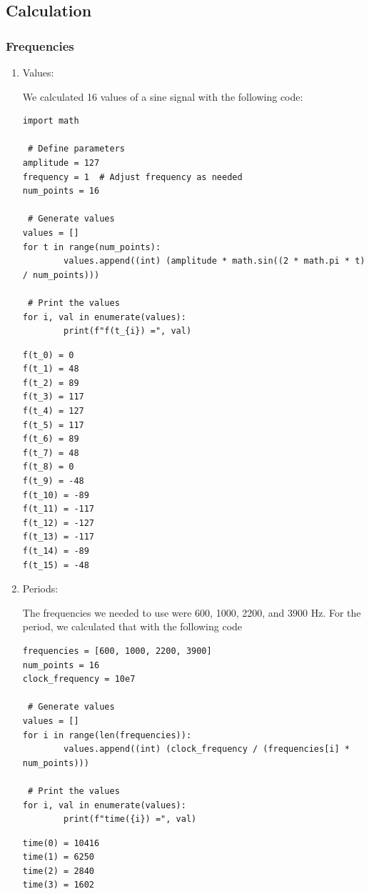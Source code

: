 \documentclass[a4paper, 12pt]{article}
\begin{document}
\subsection{Calculation}
\label{sec:org0fa0015}

\subsubsection{Frequencies}
\label{sec:org374977f}
\begin{enumerate}
\item Values:
\label{sec:org32cb88c}

We calculated 16 values of a sine signal with the following code:

\begin{verbatim}
import math

 # Define parameters
amplitude = 127
frequency = 1  # Adjust frequency as needed
num_points = 16

 # Generate values
values = []
for t in range(num_points):
        values.append((int) (amplitude * math.sin((2 * math.pi * t) / num_points)))

 # Print the values
for i, val in enumerate(values):
        print(f"f(t_{i}) =", val)
\end{verbatim}

\begin{verbatim}
f(t_0) = 0
f(t_1) = 48
f(t_2) = 89
f(t_3) = 117
f(t_4) = 127
f(t_5) = 117
f(t_6) = 89
f(t_7) = 48
f(t_8) = 0
f(t_9) = -48
f(t_10) = -89
f(t_11) = -117
f(t_12) = -127
f(t_13) = -117
f(t_14) = -89
f(t_15) = -48
\end{verbatim}
\item Periods:
\label{sec:org6e09b40}

The frequencies we needed to use were 600, 1000, 2200, and 3900 Hz. For the period, we calculated that with the following code

\begin{verbatim}
frequencies = [600, 1000, 2200, 3900]
num_points = 16
clock_frequency = 10e7

 # Generate values
values = []
for i in range(len(frequencies)):
        values.append((int) (clock_frequency / (frequencies[i] * num_points)))

 # Print the values
for i, val in enumerate(values):
        print(f"time({i}) =", val)
\end{verbatim}

\begin{verbatim}
time(0) = 10416
time(1) = 6250
time(2) = 2840
time(3) = 1602
\end{verbatim}
\end{enumerate}
\end{document}
